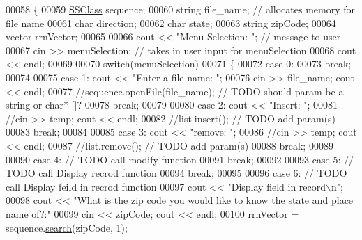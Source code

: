 \begin{DoxyCode}
00058 \{
00059     \hyperlink{classSSClass}{SSClass} sequence;
00060     \textcolor{keywordtype}{string} file\_name;   \textcolor{comment}{// allocates memory for file name}
00061     \textcolor{keywordtype}{char} direction;
00062     \textcolor{keywordtype}{char} state;
00063     \textcolor{keywordtype}{string} zipCode;
00064     vector rrnVector;
00065 
00066     cout << \textcolor{stringliteral}{"Menu Selection: "};     \textcolor{comment}{// message to user  }
00067     cin >> menuSelection;           \textcolor{comment}{// takes in user input for menuSelection}
00068     cout << endl;                   
00069 
00070     \textcolor{keywordflow}{switch}(menuSelection)
00071     \{
00072         \textcolor{keywordflow}{case} 0: 
00073                 \textcolor{keywordflow}{break};
00074 
00075         \textcolor{keywordflow}{case} 1: cout << \textcolor{stringliteral}{"Enter a file name: "};
00076                 cin >> file\_name; cout << endl;
00077                 \textcolor{comment}{//sequence.openFile(file\_name); // TODO should param be a string or char* []?}
00078                 \textcolor{keywordflow}{break};
00079         
00080         \textcolor{keywordflow}{case} 2: cout << \textcolor{stringliteral}{"Insert: "};
00081                 \textcolor{comment}{//cin >> temp; cout << endl;}
00082                 \textcolor{comment}{//list.insert();    // TODO add param(s)}
00083                 \textcolor{keywordflow}{break};
00084         
00085         \textcolor{keywordflow}{case} 3: cout << \textcolor{stringliteral}{"remove: "};
00086                 \textcolor{comment}{//cin >> temp; cout << endl;}
00087                 \textcolor{comment}{//list.remove();    // TODO add param(s)}
00088                 \textcolor{keywordflow}{break};
00089 
00090         \textcolor{keywordflow}{case} 4: \textcolor{comment}{// TODO call modify function}
00091                 \textcolor{keywordflow}{break};
00092 
00093         \textcolor{keywordflow}{case} 5: \textcolor{comment}{// TODO call Display recrod function}
00094                 \textcolor{keywordflow}{break};
00095 
00096         \textcolor{keywordflow}{case} 6: \textcolor{comment}{// TODO call Display feild in recrod function}
00097             cout << \textcolor{stringliteral}{"Display field in record\(\backslash\)n"};
00098             cout << \textcolor{stringliteral}{"What is the zip code you would like to know the state and place name of?:"}
00099                 cin << zipCode; cout << endl;
00100             rrnVector = sequence.\hyperlink{classSSClass_a9df3598c000a6a5e9ef994d19196e69f}{search}(zipCode, 1);

\end{DoxyCode}

